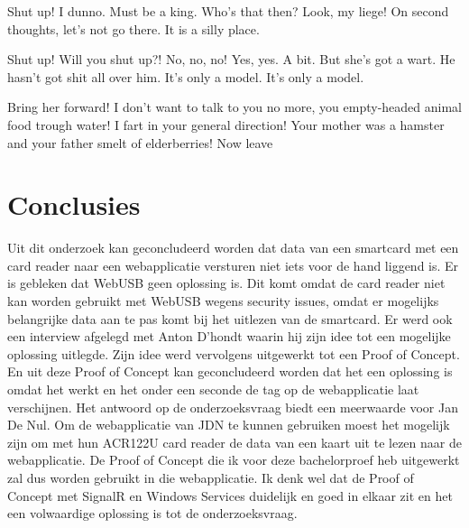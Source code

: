 \documentclass[a0,portrait]{hogent-poster}
\begin{document}
\begin{multicols}{2}
Shut up! I dunno. Must be a king. Who's that then? Look, my liege! On second thoughts, let's not go there. It is a silly place.

Shut up! Will you shut up?! No, no, no! Yes, yes. A bit. But she's got a wart. He hasn't got shit all over him. It's only a model. It's only a model.

Bring her forward! I don't want to talk to you no more, you empty-headed animal food trough water! I fart in your general direction! Your mother was a hamster and your father smelt of elderberries! Now leave 





\section{Conclusies}

Uit dit onderzoek kan geconcludeerd worden dat data van een smartcard met een card reader naar een webapplicatie versturen niet iets voor de hand liggend is. Er is gebleken dat WebUSB geen oplossing is. Dit komt omdat de card reader niet kan worden gebruikt met WebUSB wegens security issues, omdat er mogelijks belangrijke data aan te pas komt bij het uitlezen van de smartcard. 
Er werd ook een interview afgelegd met Anton D'hondt waarin hij zijn idee tot een mogelijke oplossing uitlegde. Zijn idee werd vervolgens uitgewerkt tot een Proof of Concept. En uit deze Proof of Concept kan geconcludeerd worden dat het een oplossing is omdat het werkt en het onder een seconde de tag op de webapplicatie laat verschijnen. 
Het antwoord op de onderzoeksvraag biedt een meerwaarde voor Jan De Nul. Om de webapplicatie van JDN te kunnen gebruiken moest het mogelijk zijn om met hun ACR122U card reader de data van een kaart uit te lezen naar de webapplicatie. De Proof of Concept die ik voor deze bachelorproef heb uitgewerkt zal dus worden gebruikt in die webapplicatie. Ik denk wel dat de Proof of Concept met SignalR en Windows Services duidelijk en goed in elkaar zit en het een volwaardige oplossing is tot de onderzoeksvraag.


\end{multicols}
\end{document}
